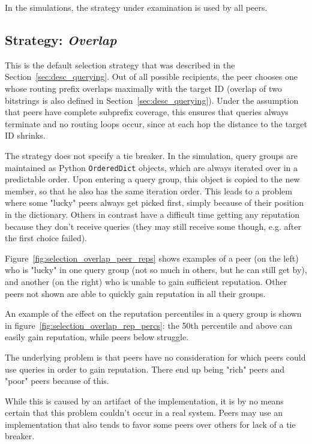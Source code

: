 In the simulations, the strategy under examination is used by all peers.

\subsection{Strategy: \emph{Overlap}}
\label{sec:rep_avail_selection_overlap}
This is the default selection strategy that was described in the
Section~\ref{sec:desc_querying}. Out of all possible recipients, the peer
chooses one whose routing prefix overlaps maximally with the target ID (overlap
of two bitstrings is also defined in Section~\ref{sec:desc_querying}). Under the
assumption that peers have complete subprefix coverage, this ensures that
queries always terminate and no routing loops occur, since at each hop the
distance to the target ID shrinks.

The strategy does not specify a tie breaker. In the simulation, query groups are
maintained as Python \texttt{OrderedDict} objects, which are always iterated
over in a predictable order. Upon entering a query group, this object is copied
to the new member, so that he also has the same iteration order. This leads to a
problem where some "lucky" peers always get picked first, simply because of
their position in the dictionary. Others in contrast have a difficult time
getting any reputation because they don't receive queries (they may still
receive some though, e.g. after the first choice failed).

Figure~\ref{fig:selection_overlap_peer_reps} shows examples of a peer (on the
left) who is "lucky" in one query group (not so much in others, but he can still
get by), and another (on the right) who is unable to gain sufficient reputation.
Other peers not shown are able to quickly gain reputation in all their groups.

An example of the effect on the reputation percentiles in a query group is shown
in figure~\ref{fig:selection_overlap_rep_percs}: the 50th percentile and above
can easily gain reputation, while peers below struggle.

The underlying problem is that peers have no consideration for which peers could
use queries in order to gain reputation. There end up being "rich" peers and
"poor" peers because of this.

While this is caused by an artifact of the implementation, it is by no means
certain that this problem couldn't occur in a real system. Peers may use an
implementation that also tends to favor some peers over others for lack of a tie
breaker.

